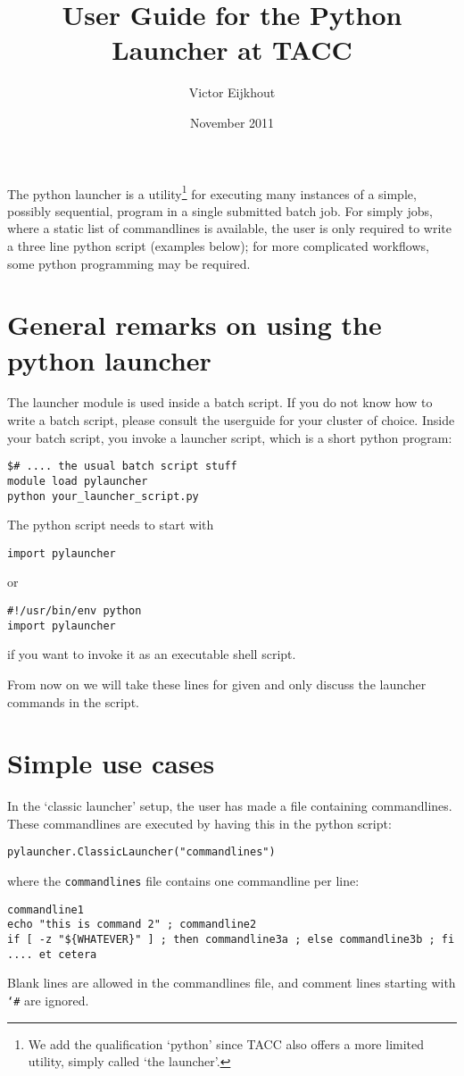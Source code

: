 \documentclass[11pt]{artikel3}
\newcommand\n[1]{{\tt #1}}
\begin{document}
\title{User Guide for the Python Launcher at TACC}
\author{Victor Eijkhout}
\date{November 2011}
\maketitle

The python launcher is a utility\footnote{We add the qualification
  `python' since TACC also offers a more limited utility, simply
  called `the launcher'.} for executing many instances of a
simple, possibly sequential, program in a single submitted batch
job. For simply jobs, where a static list of commandlines is
available, the user is only required to write a three line python
script (examples below); for more complicated workflows, some python
programming may be required.

\section*{General remarks on using the python launcher}

The launcher module is used inside a batch script. If you do not know
how to write a batch script, please consult the userguide for your
cluster of choice. Inside your batch script, you invoke a launcher
script, which is a short python program:
\begin{verbatim}
$# .... the usual batch script stuff
module load pylauncher
python your_launcher_script.py
\end{verbatim}
The python script needs to start with
\begin{verbatim}
import pylauncher
\end{verbatim}
or 
\begin{verbatim}
#!/usr/bin/env python
import pylauncher
\end{verbatim}
if you want to invoke it as an executable shell script.

From now on we will take these lines for given and only discuss the
launcher commands in the script.

\section*{Simple use cases}

In the `classic launcher' setup, the user has made a file containing
commandlines. These commandlines are executed by having this in the
python script:
\begin{verbatim}
pylauncher.ClassicLauncher("commandlines")
\end{verbatim}
where the \n{commandlines} file contains one commandline per line:
\begin{verbatim}
commandline1
echo "this is command 2" ; commandline2
if [ -z "${WHATEVER}" ] ; then commandline3a ; else commandline3b ; fi
.... et cetera
\end{verbatim}
Blank lines are allowed in the commandlines file, and comment lines
starting with \n{\char`\#} are ignored.
\end{document}
